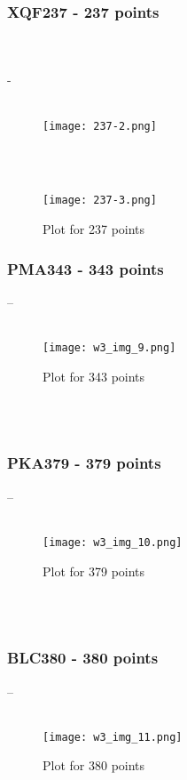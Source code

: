 \documentclass[conference]{IEEEtran}
\begin{document}
\subsubsection{XQF237 - 237 points}
\\
\\
-
\\
\\
\begin{figure}[htbp]
\centerline{\texttt{[image: 237-2.png]}}
\label{fig}
\end{figure}
\\
\\
\begin{figure}[htbp]
\centerline{\texttt{[image: 237-3.png]}}
\caption{Plot for 237 points}
\label{fig}
\end{figure}

\subsubsection{PMA343 - 343 points}

--
\\
\\
\begin{figure}[htbp]
\centerline{\texttt{[image: w3\_img\_9.png]}}
\caption{Plot for 343 points}
\label{fig}
\end{figure}
\\
\\
\subsubsection{PKA379 - 379 points}
--
\\
\\
\begin{figure}[htbp]
\centerline{\texttt{[image: w3\_img\_10.png]}}
\caption{Plot for 379 points}
\label{fig}
\end{figure}
\\
\\
\subsubsection{BLC380 - 380 points}
--
\\
\\
\begin{figure}[htbp]
\centerline{\texttt{[image: w3\_img\_11.png]}}
\caption{Plot for 380 points}
\label{fig}
\end{figure}
\end{document}
